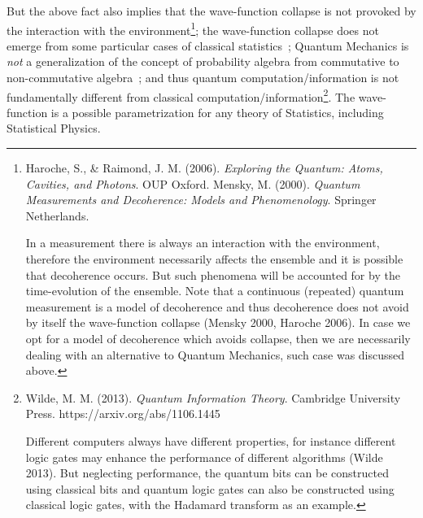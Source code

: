 \documentclass[11pt]{book}
\begin{document}
But the above fact also implies that the wave-function collapse is not
provoked by the interaction with the environment\footnote{Haroche, S.,
  \& Raimond, J. M. (2006). \emph{Exploring the Quantum: Atoms,
  Cavities, and Photons}. OUP Oxford. Mensky, M. (2000). \emph{Quantum
  Measurements and Decoherence: Models and Phenomenology}. Springer
  Netherlands.

  In a measurement there is always an interaction with the environment,
  therefore the environment necessarily affects the ensemble and it is
  possible that decoherence occurs. But such phenomena will be accounted
  for by the time-evolution of the ensemble. Note that a continuous
  (repeated) quantum measurement is a model of decoherence and thus
  decoherence does not avoid by itself the wave-function collapse
  (Mensky 2000, Haroche 2006). In case we opt for a model of decoherence
  which avoids collapse, then we are necessarily dealing with an
  alternative to Quantum Mechanics, such case was discussed above.}; the
wave-function collapse does not emerge from some particular cases of
classical
statistics~\cite{Wetterich2010Quantum}; Quantum Mechanics is \emph{not} a generalization of the concept
of probability algebra from commutative to non-commutative
algebra~\cite{Streater2000Classical}; and thus quantum computation/information is not fundamentally
different from classical computation/information\footnote{Wilde, M. M.
  (2013). \emph{Quantum Information Theory}. Cambridge University Press.
  https://arxiv.org/abs/1106.1445

  Different computers always have different properties, for instance
  different logic gates may enhance the performance of different
  algorithms (Wilde 2013). But neglecting performance, the quantum bits
  can be constructed using classical bits and quantum logic gates can
  also be constructed using classical logic gates, with the Hadamard
  transform as an example.}. The wave-function is a possible
parametrization for any theory of Statistics, including Statistical
Physics.
\end{document}
